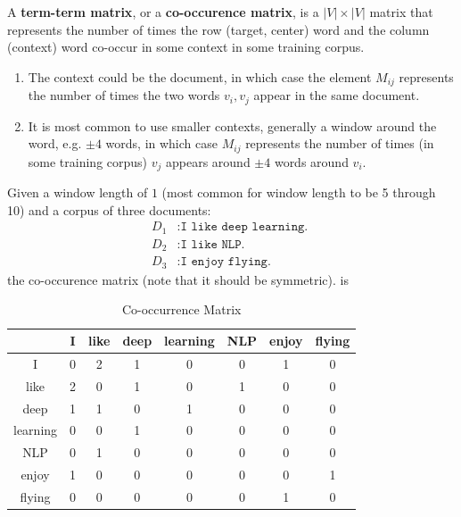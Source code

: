 \documentclass{article}
\begin{document}
      \begin{definition}
        A \textbf{term-term matrix}, or a \textbf{co-occurence matrix}, is a $|V| \times |V|$ matrix that represents the number of times the row (target, center) word and the column (context) word co-occur in some context in some training corpus. 
        \begin{enumerate}
          \item The context could be the document, in which case the element $M_{ij}$ represents the number of times the two words $v_i, v_j$ appear in the same document. 
          \item It is most common to use smaller contexts, generally a window around the word, e.g. $\pm 4$ words, in which case $M_{ij}$ represents the number of times (in some training corpus) $v_j$ appears around $\pm 4$ words around $v_i$. 
        \end{enumerate}
      \end{definition}

      \begin{example}
        Given a window length of $1$ (most common for window length to be 5 through 10) and a corpus of three documents: 
        \begin{align*}
            D_1 & : \texttt{I like deep learning. } \\
            D_2 & : \texttt{I like NLP. } \\
            D_3 & : \texttt{I enjoy flying.}
        \end{align*}
        the co-occurence matrix (note that it should be symmetric). is 
        \begin{table}[H]
        \centering
        \begin{tabular}{|c||*{7}{c|}}
        \hline
         & I & like & deep & learning & NLP & enjoy & flying \\ 
        \hline\hline
        I       & 0 & 2 & 1 & 0 & 0 & 1 & 0 \\ \hline
        like    & 2 & 0 & 1 & 0 & 1 & 0 & 0 \\ \hline
        deep    & 1 & 1 & 0 & 1 & 0 & 0 & 0 \\ \hline
        learning& 0 & 0 & 1 & 0 & 0 & 0 & 0 \\ \hline
        NLP     & 0 & 1 & 0 & 0 & 0 & 0 & 0 \\ \hline
        enjoy   & 1 & 0 & 0 & 0 & 0 & 0 & 1 \\ \hline
        flying  & 0 & 0 & 0 & 0 & 0 & 1 & 0 \\ \hline
        \end{tabular}
        \caption{Co-occurrence Matrix}
        \end{table}
      \end{example}
\end{document}
